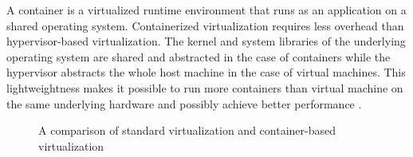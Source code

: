 A container is a virtualized runtime environment that runs as an application on a shared operating system. Containerized virtualization requires less overhead than hypervisor-based virtualization. The kernel and system libraries of the underlying operating system are shared and abstracted in the case of containers while the hypervisor abstracts the whole host machine in the case of virtual machines. This lightweightness makes it possible to run more containers than virtual machine on the same underlying hardware and possibly achieve better performance \cite{xavier2013performance}.
\\
\begin{figure}[h!]
	 \hfill
\caption{A comparison of standard virtualization and container-based virtualization}
\label{request-headers}
\end{figure}

